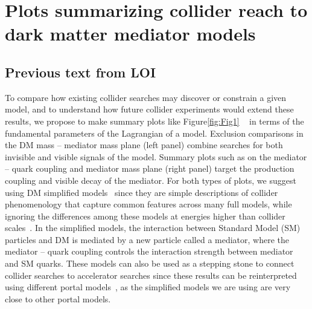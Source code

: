 \documentclass[11pt]{article}
\begin{document}
\section{Plots summarizing collider reach to dark matter mediator models}

\subsection{Previous text from LOI}

To compare how existing collider searches may discover or constrain a given model, and to understand how future collider experiments would extend these results, we propose to make summary plots like Figure\ref{fig:Fig1} ~\cite{CMSSummary,ATL-PHYS-DMSUM-JHEP-2019} in terms of the fundamental parameters of the Lagrangian of a model. 
Exclusion comparisons in the DM mass – mediator mass plane (left panel) combine searches for both invisible and visible signals of the model. Summary plots such as on the mediator – quark coupling and mediator mass plane (right panel) target the production coupling and visible decay of the mediator. For both types of plots, we suggest using DM simplified models~\cite{ABERCROMBIE2020100371} since they are simple descriptions of collider phenomenology that capture common features across many full models, while ignoring the differences among these models at energies higher than collider scales~\cite{doi:10.1146/annurev-nucl-101917-021008}. In the simplified models, the interaction between Standard Model (SM) particles and DM is mediated by a new particle called a mediator, where the mediator – quark coupling controls the interaction strength between mediator and SM quarks. These models can also be used as a stepping stone to connect collider searches to accelerator searches since these results can be reinterpreted using different portal models~\cite{Beacham:2652223}, as the simplified models we are using are very close to other portal models. 

\end{document}
